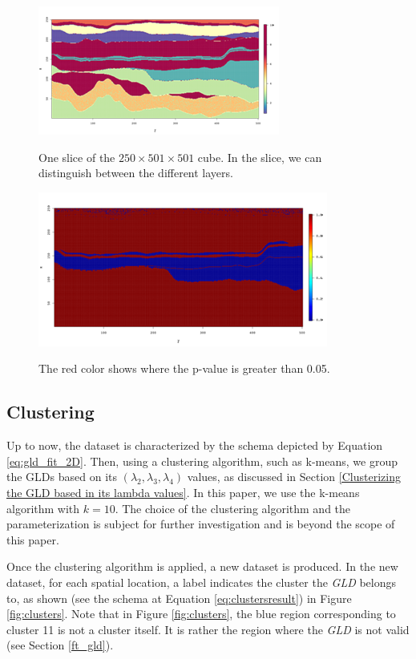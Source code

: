 \documentclass[11pt]{article}
\begin{document}
\begin{figure}[!ht]
\begin{multicols}{2}
    \centering
    \includegraphics{figs/clusters_slice.png}
    \caption{One slice of the $250\times501\times501$ cube. In the slice, we can distinguish between the different layers.}
    \label{fig:slice1}
    \centering
    \includegraphics{figs/p_value_greater_05.png}
    \caption{The red color shows where the p-value is greater than 0.05.}
    \label{fig:p_values_greater_05}
\end{multicols}
\end{figure}

\subsection{Clustering}\label{useCaseClustering}
Up to now, the dataset is characterized by the schema depicted by Equation \ref{eq:gld_fit_2D}. Then, using a clustering algorithm, such as k-means, we group the GLDs based on its $(\lambda_{2}, \lambda_{3}, \lambda_{4})$ values, as discussed in Section \ref{Clusterizing the GLD based in its lambda values}.
In this paper, we use the k-means algorithm with $k=10$. The choice of the clustering algorithm and the parameterization is subject for further investigation and is beyond the scope of this paper.

Once the clustering algorithm is applied, a new dataset is produced. In the new dataset,  for each spatial location, a label indicates the cluster the \textit{GLD} belongs to, as shown (see the schema at Equation \ref{eq:clustersresult}) in Figure \ref{fig:clusters}. Note that in Figure \ref{fig:clusters}, the blue region corresponding to cluster 11 is not a cluster itself. It is rather the region where the \textit{GLD} is not valid (see Section \ref{ft_gld}).
\end{document}
